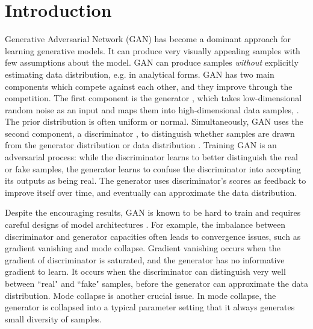 \documentclass[runningheads]{llncs}
\newcommand*{\eg}{e.g. }
\begin{document}
\section{Introduction}
Generative Adversarial Network \cite{goodfellow-nisp-2014} (GAN) has become a dominant approach for learning generative models. It can produce very visually appealing samples with few assumptions about the model. GAN can produce samples \textit{without} explicitly estimating data distribution, \eg in analytical forms. GAN has two main components which compete  against each other, and they improve through the competition. The first component is the generator , which takes low-dimensional random noise  as an input and maps them into high-dimensional data samples,  . The prior distribution  is often uniform or normal. Simultaneously, GAN uses the second component,  a discriminator , to distinguish whether samples are drawn from the generator distribution  or data distribution . Training GAN is an adversarial process: while the discriminator  learns to better distinguish the real or fake samples, the generator  learns to confuse the discriminator  into accepting its outputs as being real. The generator  uses discriminator's scores as feedback to improve itself over time, and eventually can approximate the data distribution.

Despite the encouraging results, GAN is known to be hard to train and requires careful designs of model architectures \cite{goodfellow-nips-2016,radford-arxiv-2015}. For example, the imbalance between discriminator and generator capacities often leads to convergence issues, such as gradient vanishing and mode collapse. Gradient vanishing occurs when the gradient of discriminator is saturated, and the generator has no informative gradient to learn. It occurs when the discriminator can distinguish very well between ``real" and ``fake" samples, before the generator can approximate the data distribution. Mode collapse is another crucial issue. In mode collapse, the generator is collapsed into a typical parameter setting that it always generates small diversity of samples. 
\end{document}
